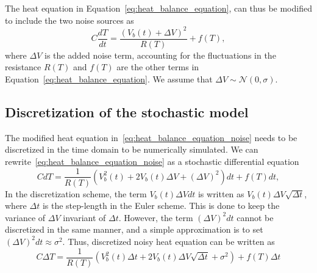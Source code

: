 The heat equation in Equation~\eqref{eq:heat_balance_equation}, can
thus be modified to include the two noise sources as
\begin{equation}
  \label{eq:heat_balance_equation_noise}
  C\frac{dT}{dt}=\frac{(V_b(t) + \Delta V)^2}{R(T)}+ f(T),
\end{equation}
where $\Delta V$ is the added noise term, accounting for the
fluctuations in the resistance $R(T)$ and $f(T)$ are the other terms
in Equation~\eqref{eq:heat_balance_equation}. We assume that $\Delta V
\sim \mathcal{N} (0, \sigma)$.

\subsection{Discretization of the stochastic model}


The modified heat equation in~\eqref{eq:heat_balance_equation_noise}
needs to be discretized in the time domain to be numerically
simulated. We can rewrite~\eqref{eq:heat_balance_equation_noise} as
a stochastic differential equation
\begin{equation}
  \label{eq:heat_balance_equation_noise_SDE}
  CdT=\frac{1}{R(T)} (V_b^2(t) + 2 V_b(t) \Delta V + (\Delta V)^2)dt + f(T) dt,
\end{equation}
In the discretization scheme, the term $V_b(t) \Delta V dt $ is
written as $V_b(t) \Delta V \sqrt{\Delta t}$, where $\Delta t$ is the
step-length in the Euler scheme. This is done to keep the variance of
$\Delta V$ invariant of $\Delta t$. However, the term $(\Delta V)^2dt$
cannot be discretized in the same manner, and a simple approximation
is to set $(\Delta V)^2 dt \approx  \sigma^2$. Thus, discretized noisy
heat equation can be written as
\begin{equation}
  \label{eq:heat_balance_equation_noise_SDE_disc}
  C \Delta T=\frac{1}{R(T)} (V_b^2(t) \Delta t  + 2 V_b(t) \Delta V \sqrt{\Delta t}+ \sigma^{2}) + f(T) \Delta t
\end{equation}


